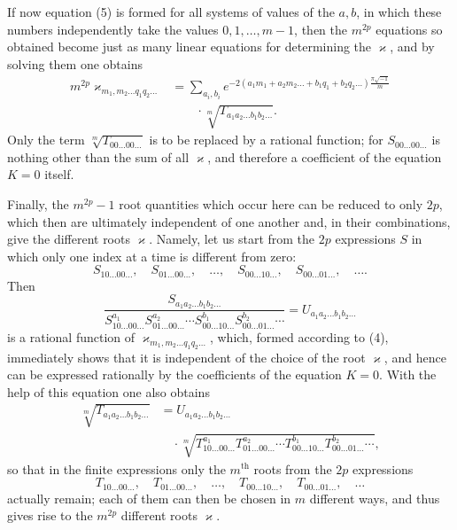 \documentclass[10pt]{article}
\begin{document}
If now equation (5) is formed for all systems of values of the \(a,b\), in which these numbers independently take the values \(0,1,\ldots,m-1\), then the \(m^{2p}\) equations so obtained become just as many linear equations for determining the \(\varkappa\), and by solving them one obtains
\[
\begin{aligned}
m^{2p}\varkappa_{m_1,m_2\ldots q_1q_2\ldots}
&=\sum_{a_i,b_i}
e^{-2(a_1m_1+a_2m_2\ldots+b_1q_1+b_2q_2\ldots)
\frac{\pi\sqrt{-1}}{m}}\\
&\qquad\cdot
\sqrt[m]{T_{a_1a_2\ldots b_1b_2\ldots}}.
\end{aligned}
\]
Only the term \(\sqrt[m]{T_{00\ldots00\ldots}}\) is to be replaced by a rational function; for \(S_{00\ldots00\ldots}\) is nothing other than the sum of all \(\varkappa\), and therefore a coefficient of the equation \(K=0\) itself.

Finally, the \(m^{2p}-1\) root quantities which occur here can be reduced to only \(2p\), which then are ultimately independent of one another and, in their combinations, give the different roots \(\varkappa\). Namely, let us start from the \(2p\) expressions \(S\) in which only one index at a time is different from zero:
\[
S_{10\ldots00\ldots},\quad
S_{01\ldots00\ldots},\quad\ldots,\quad
S_{00\ldots10\ldots},\quad
S_{00\ldots01\ldots},\quad\ldots.
\]
Then
\[
\frac{
S_{a_1a_2\ldots b_1b_2\ldots}
}{
S_{10\ldots00\ldots}^{a_1}
S_{01\ldots00\ldots}^{a_2}\cdots
S_{00\ldots10\ldots}^{b_1}
S_{00\ldots01\ldots}^{b_2}\cdots
}
=U_{a_1a_2\ldots b_1b_2\ldots}
\]
is a rational function of \(\varkappa_{m_1,m_2\ldots q_1q_2\ldots}\), which, formed according to (4), immediately shows that it is independent of the choice of the root \(\varkappa\), and hence can be expressed rationally by the coefficients of the equation \(K=0\). With the help of this equation one also obtains
\[
\begin{aligned}
\sqrt[m]{T_{a_1a_2\ldots b_1b_2\ldots}}
&=
U_{a_1a_2\ldots b_1b_2\ldots}\\
&\quad\cdot
\sqrt[m]{
T_{10\ldots00\ldots}^{a_1}
T_{01\ldots00\ldots}^{a_2}
\cdots
T_{00\ldots10\ldots}^{b_1}
T_{00\ldots01\ldots}^{b_2}
\cdots},
\end{aligned}
\]
so that in the finite expressions only the \(m^{\text{th}}\) roots from the \(2p\) expressions
\[
T_{10\ldots00\ldots},\quad
T_{01\ldots00\ldots},\quad\ldots,\quad
T_{00\ldots10\ldots},\quad
T_{00\ldots01\ldots},\quad\ldots
\]
actually remain; each of them can then be chosen in \(m\) different ways, and thus gives rise to the \(m^{2p}\) different roots \(\varkappa\).
\end{document}
